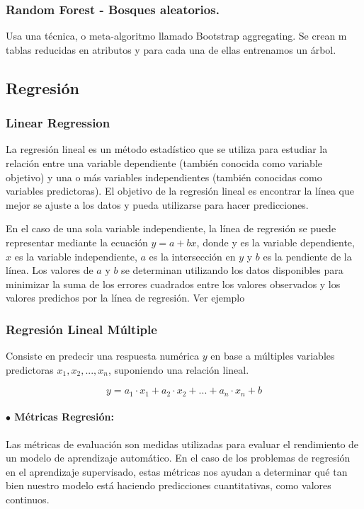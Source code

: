 \documentclass[../main.tex]{subfiles}
\begin{document}
        \subsubsection{Random Forest - Bosques aleatorios.}
            Usa una técnica, o meta-algoritmo llamado Bootstrap aggregating. Se crean m tablas reducidas en atributos y para cada una de ellas entrenamos un árbol.
            
    \subsection{Regresión}
        \subsubsection{Linear Regression}
            La regresión lineal es un método estadístico que se utiliza para estudiar la relación entre una variable dependiente (también conocida como variable objetivo) y una o más variables independientes (también conocidas como variables predictoras). El objetivo de la regresión lineal es encontrar la línea que mejor se ajuste a los datos y pueda utilizarse para hacer predicciones.
        
            En el caso de una sola variable independiente, la línea de regresión se puede representar mediante la ecuación $y = a + bx$, donde y es la variable dependiente, $x$ es la variable independiente, $a$ es la intersección en $y$ y $b$ es la pendiente de la línea. Los valores de $a$ y $b$ se determinan utilizando los datos disponibles para minimizar la suma de los errores cuadrados entre los valores observados y los valores predichos por la línea de regresión. Ver ejemplo %
            
        \subsubsection{Regresión Lineal Múltiple}
            Consiste en predecir una respuesta numérica $y$ en base a múltiples variables predictoras $x_1, x_2, ..., x_n $, suponiendo una relación lineal. 
		
		\begin{equation}
			y = a_1 \cdot x_1 + a_2 \cdot x_2 + ... + a_n \cdot x_n + b
		\end{equation}
		
		\paragraph{$\bullet$ Métricas Regresión:}
                Las métricas de evaluación son medidas utilizadas para evaluar el rendimiento de un modelo de aprendizaje automático. En el caso de los problemas de regresión en el aprendizaje supervisado, estas métricas nos ayudan a determinar qué tan bien nuestro modelo está haciendo predicciones cuantitativas, como valores continuos.\\
		
\end{document}
